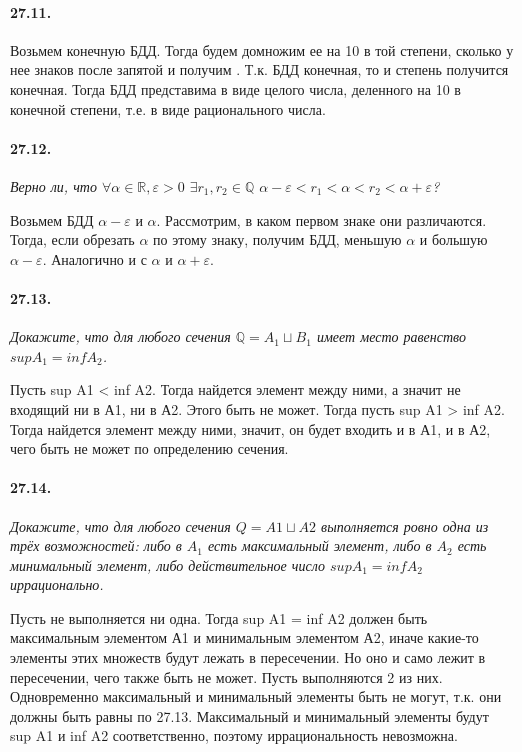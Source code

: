 \documentclass{book}
\begin{document}
\paragraph{27.11.}
Возьмем конечную БДД. Тогда будем домножим ее на 10 в той степени, сколько у нее знаков после запятой и получим . Т.к. БДД конечная, то и степень получится конечная. Тогда БДД представима в виде целого числа, деленного на 10 в конечной степени, т.е. в виде рационального числа.

\paragraph{27.12.}
\textit{Верно ли, что $\forall \alpha \in \mathbb{R}, \varepsilon > 0$ $\exists r_1, r_2 \in \mathbb{Q}$ $\alpha - \varepsilon < r_1 < \alpha < r_2 < \alpha + \varepsilon$?} 

Возьмем БДД $\alpha - \varepsilon$ и $\alpha$. Рассмотрим, в каком первом знаке они различаются. Тогда, если обрезать $\alpha$ по этому знаку, получим БДД, меньшую $\alpha$ и большую $\alpha - \varepsilon$. Аналогично и с $\alpha$ и $\alpha + \varepsilon$.

\paragraph{27.13.}
\textit{Докажите, что для любого сечения $\mathbb{Q} = A_1 \sqcup B_1$ имеет место равенство $sup A_1 = inf A_2$.}

Пусть sup A1 < inf A2. Тогда найдется элемент между ними, а значит не входящий ни в А1, ни в А2. Этого быть не может. Тогда пусть sup A1 > inf A2. Тогда найдется элемент между ними, значит, он будет входить и в А1, и в А2, чего быть не может по определению сечения.

\paragraph{27.14.}
\textit{Докажите, что для любого сечения $Q = A1 \sqcup A2$ выполняется ровно одна из трёх возможностей: либо в $A_1$ есть максимальный элемент, либо в $A_2$ есть минимальный
элемент, либо действительное число $sup A_1 = inf A_2$ иррационально.}

Пусть не выполняется ни одна. Тогда sup A1 = inf A2 должен быть максимальным элементом А1 и минимальным элементом А2, иначе какие-то элементы этих множеств будут лежать в пересечении. Но оно и само лежит в пересечении, чего также быть не может.
Пусть выполняются 2 из них. Одновременно максимальный и минимальный элементы быть не могут, т.к. они должны быть равны по 27.13. Максимальный и минимальный элементы будут sup A1 и inf A2 соответственно, поэтому иррациональность невозможна. 
\end{document}
